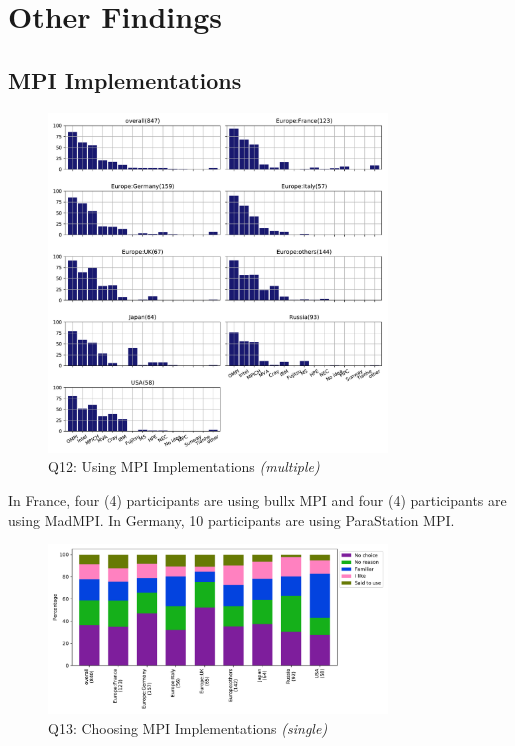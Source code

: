 \documentclass[conference,10pt,letterpaper]{IEEEtran}
\begin{document}
\section{Other Findings}

\subsection{MPI Implementations}

\begin{figure}[htb]
\begin{center}
\includegraphics[width=9cm]{Figs/Q12.pdf}
\caption{Q12: Using MPI Implementations {\it(multiple)}}
\label{fig:using-implementations}
\end{center}
\end{figure}

In France, four (4) participants are using bullx MPI and four (4)
participants are using MadMPI. In Germany, 10 participants are using
ParaStation MPI.

\begin{figure}[htb]
\begin{center}
\includegraphics[width=9cm]{Figs/Q13.pdf}
\caption{Q13: Choosing MPI Implementations {\it(single)}}
\label{fig:choosing-implementation}
\end{center}
\end{figure}
\end{document}
